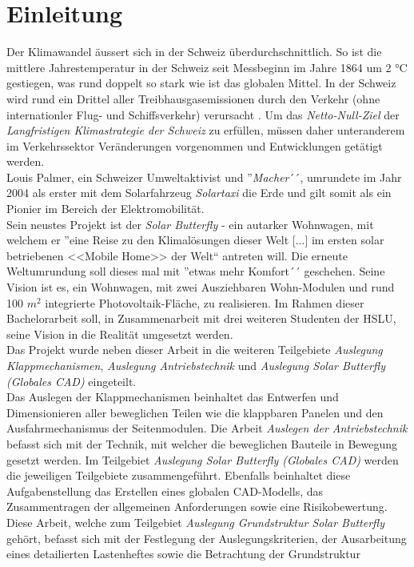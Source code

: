\section{Einleitung}
Der Klimawandel äussert sich in der Schweiz überdurchschnittlich. So ist die mittlere Jahrestemperatur in der Schweiz seit Messbeginn im Jahre 1864 um 2 °C gestiegen, was rund doppelt so stark wie ist das globalen Mittel. In der Schweiz wird rund ein Drittel aller Treibhausgasemissionen durch den Verkehr (ohne internationler Flug- und Schiffsverkehr) verursacht \cite{BAFU}. Um das \emph{Netto-Null-Ziel} der \emph{Langfristigen Klimastrategie der Schweiz} zu erfüllen, müssen daher unteranderem im Verkehrssektor Veränderungen vorgenommen und Entwicklungen getätigt werden.\\
Louis Palmer, ein Schweizer Umweltaktivist und ''\emph{Macher}´´, umrundete im Jahr 2004 als erster mit dem Solarfahrzeug \emph{Solartaxi} die Erde und gilt somit als ein Pionier im Bereich der Elektromobilität.\\
Sein neustes Projekt ist der \emph{Solar Butterfly} - ein autarker Wohnwagen, mit welchem er ''eine Reise zu den Klimalösungen dieser Welt [...] im ersten solar betriebenen <<Mobile Home>> der Welt`` antreten will. Die erneute Weltumrundung soll dieses mal mit ''etwas mehr Komfort´´ geschehen. Seine Vision ist es, ein Wohnwagen, mit zwei Ausziehbaren Wohn-Modulen und rund 100 $m^2$ integrierte Photovoltaik-Fläche, zu realisieren. Im Rahmen dieser Bachelorarbeit soll, in Zusammenarbeit mit drei weiteren Studenten der HSLU, seine Vision in die Realität umgesetzt werden.\\
Das Projekt wurde neben dieser Arbeit in die weiteren Teilgebiete \emph{Auslegung Klappmechanismen}, \emph{Auslegung Antriebstechnik} und \emph{Auslegung Solar Butterfly (Globales CAD)} eingeteilt.\\
Das Auslegen der Klappmechanismen beinhaltet das Entwerfen und Dimensionieren aller beweglichen Teilen wie die klappbaren Panelen und den Ausfahrmechanismus der Seitenmodulen. Die Arbeit \emph{Auslegen der Antriebstechnik} befasst sich mit der Technik, mit welcher die beweglichen Bauteile in Bewegung gesetzt werden. Im Teilgebiet \emph{Auslegung Solar Butterfly (Globales CAD)} werden die jeweiligen Teilgebiete zusammengeführt. Ebenfalls beinhaltet diese Aufgabenstellung das Erstellen eines globalen CAD-Modells, das Zusammentragen der allgemeinen Anforderungen sowie eine Risikobewertung.\\
Diese Arbeit, welche zum Teilgebiet \emph{Auslegung Grundstruktur Solar Butterfly} gehört, befasst sich mit der Festlegung der Auslegungskriterien, der Ausarbeitung eines detailierten Lastenheftes sowie die Betrachtung der Grundstruktur

